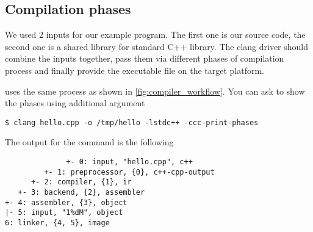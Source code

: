 \subsection{Compilation phases}
We used 2 inputs for our example program. The first one is our source code, the
second one is a shared library for standard C++ library. The clang driver should
combine the inputs together, pass them via different phases of compilation
process and finally provide the executable file on the target platform.

\clang uses the same process as shown in \cref{fig:compiler_workflow}. You can
ask \clang to show the phases using  additional
argument
\begin{adjustwidth}{0em}{0em}
\begin{verbatim}
$ clang hello.cpp -o /tmp/hello -lstdc++ -ccc-print-phases
\end{verbatim}
\end{adjustwidth}
The output for the command is the following
\begin{adjustwidth}{0em}{0em}
\begin{verbatim}
              +- 0: input, "hello.cpp", c++
         +- 1: preprocessor, {0}, c++-cpp-output
      +- 2: compiler, {1}, ir
   +- 3: backend, {2}, assembler
+- 4: assembler, {3}, object
|- 5: input, "1%dM", object
6: linker, {4, 5}, image
\end{verbatim}
\end{adjustwidth}

